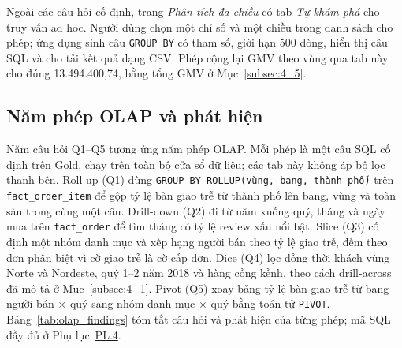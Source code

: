 \documentclass[a4paper]{article}
\begin{document}
Ngoài các câu hỏi cố định, trang \textit{Phân tích đa chiều} có tab \textit{Tự khám phá} cho truy vấn ad hoc. Người dùng chọn một chỉ số và một chiều trong danh sách cho phép; ứng dụng sinh câu \texttt{GROUP BY} có tham số, giới hạn 500 dòng, hiển thị câu SQL và cho tải kết quả dạng CSV. Phép cộng lại GMV theo vùng qua tab này cho đúng 13.494.400,74, bằng tổng GMV ở Mục~\ref{subsec:4_5}.

\subsection{Năm phép OLAP và phát hiện}
\label{subsec:5_2}

Năm câu hỏi Q1--Q5 tương ứng năm phép OLAP. Mỗi phép là một câu SQL cố định trên Gold, chạy trên toàn bộ cửa sổ dữ liệu; các tab này không áp bộ lọc thanh bên. Roll-up (Q1) dùng \texttt{GROUP BY ROLLUP(vùng, bang, thành phố)} trên \texttt{fact\_\allowbreak{}order\_\allowbreak{}item} để gộp tỷ lệ bàn giao trễ từ thành phố lên bang, vùng và toàn sàn trong cùng một câu. Drill-down (Q2) đi từ năm xuống quý, tháng và ngày mua trên \texttt{fact\_order} để tìm tháng có tỷ lệ review xấu nổi bật. Slice (Q3) cố định một nhóm danh mục và xếp hạng người bán theo tỷ lệ giao trễ, đếm theo đơn phân biệt vì cờ giao trễ là cờ cấp đơn. Dice (Q4) lọc đồng thời khách vùng Norte và Nordeste, quý 1--2 năm 2018 và hàng cồng kềnh, theo cách drill-across đã mô tả ở Mục~\ref{subsec:4_1}. Pivot (Q5) xoay bảng tỷ lệ bàn giao trễ từ bang người bán $\times$ quý sang nhóm danh mục $\times$ quý bằng toán tử \texttt{PIVOT}. Bảng~\ref{tab:olap_findings} tóm tắt câu hỏi và phát hiện của từng phép; mã SQL đầy đủ ở Phụ lục~\hyperref[pl:4]{PL.4}.
\end{document}
